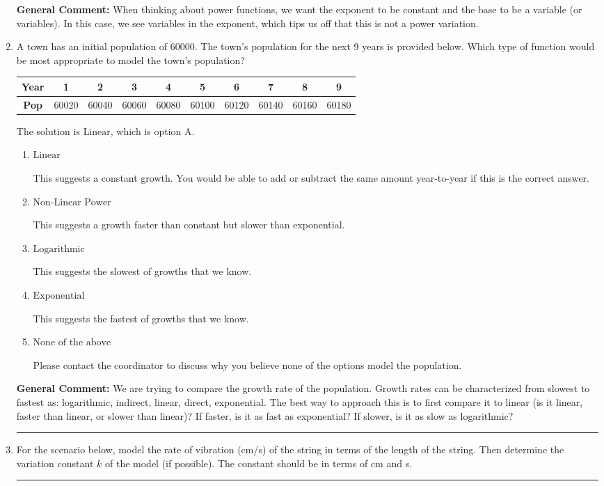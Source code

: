 \documentclass{extbook}[14pt]
\newcommand{\litem}[1]{\item #1

\rule{\textwidth}{0.4pt}}
\begin{document}
\begin{enumerate}
{\begin{enumerate}[label=\Alph*.]
\end{enumerate}

\textbf{General Comment:} When thinking about power functions, we want the exponent to be constant and the base to be a variable (or variables). In this case, we see variables in the exponent, which tips us off that this is not a power variation.
}
\litem{
A town has an initial population of 60000. The town's population for the next 9 years is provided below. Which type of function would be most appropriate to model the town's population?


\begin{tabular}{c|c|c|c|c|c|c|c|c|c}
\textbf{Year} &1 &2 &3 &4 &5 &6 &7 &8 &9\tabularnewline \hline
\textbf{Pop} &60020 &60040 &60060 &60080 &60100 &60120 &60140 &60160 &60180\end{tabular}The solution is \( \text{Linear} \), which is option A.\begin{enumerate}[label=\Alph*.]
\item \( \text{Linear} \)

This suggests a constant growth. You would be able to add or subtract the same amount year-to-year if this is the correct answer.
\item \( \text{Non-Linear Power} \)

This suggests a growth faster than constant but slower than exponential.
\item \( \text{Logarithmic} \)

This suggests the slowest of growths that we know.
\item \( \text{Exponential} \)

This suggests the fastest of growths that we know.
\item \( \text{None of the above} \)

Please contact the coordinator to discuss why you believe none of the options model the population.
\end{enumerate}

\textbf{General Comment:} We are trying to compare the growth rate of the population. Growth rates can be characterized from slowest to fastest as: logarithmic, indirect, linear, direct, exponential. The best way to approach this is to first compare it to linear (is it linear, faster than linear, or slower than linear)? If faster, is it as fast as exponential? If slower, is it as slow as logarithmic?
}
\litem{
For the scenario below, model the rate of vibration (cm/s) of the string in terms of the length of the string. Then determine the variation constant $k$ of the model (if possible). The constant should be in terms of cm and s.

}
\end{enumerate}
\end{document}
